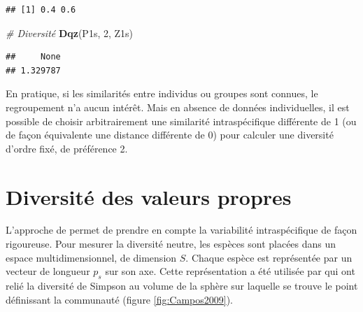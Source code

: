 \documentclass[
  11pt,
  french,
  a4paper,
  extrafontsizes,onecolumn,openright
  ]{memoir}
\newenvironment{Shaded}{\begin{snugshade}}{\end{snugshade}}
\newcommand{\CommentTok}[1]{\textcolor[rgb]{0.56,0.35,0.01}{\textit{#1}}}
\newcommand{\DecValTok}[1]{\textcolor[rgb]{0.00,0.00,0.81}{#1}}
\newcommand{\FunctionTok}[1]{\textcolor[rgb]{0.13,0.29,0.53}{\textbf{#1}}}
\newcommand{\NormalTok}[1]{#1}
\begin{document}
\begin{verbatim}
## [1] 0.4 0.6
\end{verbatim}

\begin{Shaded}
\begin{Highlighting}[]
\CommentTok{\# Diversité}
\FunctionTok{Dqz}\NormalTok{(P1s, }\DecValTok{2}\NormalTok{, Z1s)}
\end{Highlighting}
\end{Shaded}

\begin{verbatim}
##     None 
## 1.329787
\end{verbatim}

\normalsize

En pratique, si les similarités entre individus ou groupes sont connues, le regroupement n'a aucun intérêt.
Mais en absence de données individuelles, il est possible de choisir arbitrairement une similarité intraspécifique différente de 1 (ou de façon équivalente une distance différente de 0) pour calculer une diversité d'ordre fixé, de préférence 2.

\section{Diversité des valeurs propres}\label{diversituxe9-des-valeurs-propres}

L'approche de \textcite{Pavoine2014} permet de prendre en compte la variabilité intraspécifique de façon rigoureuse.
Pour mesurer la diversité neutre, les espèces sont placées dans un espace multidimensionnel, de dimension \(S\).
Chaque espèce est représentée par un vecteur de longueur \(p_s\) sur son axe.
Cette représentation a été utilisée par \textcite{Campos2009} qui ont relié la diversité de Simpson au volume de la sphère sur laquelle se trouve le point définissant la communauté (figure \ref{fig:Campos2009}).



\scriptsize
\end{document}
